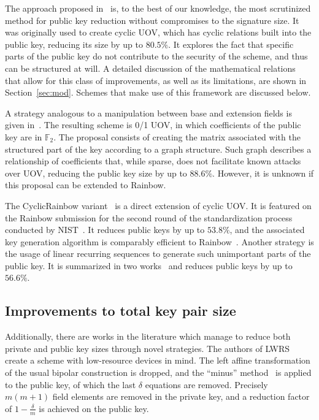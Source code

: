 \documentclass[12pt, a4paper, oneside]{memoir}
\theoremstyle{definition}
\begin{document}
The approach proposed in~\cite{Petzoldt:201006} is, to the best of our knowledge, the most scrutinized method for public key reduction without compromises to the signature size. It was originally used to create cyclic UOV, which has cyclic relations built into the public key, reducing its size by up to $80.5\%$. It explores the fact that specific parts of the public key do not contribute to the security of the scheme, and thus can be structured at will. A detailed discussion of the mathematical relations that allow for this class of improvements, as well as its limitations, are shown in Section~\ref{sec:mod}. Schemes that make use of this framework are discussed below. 

A strategy analogous to a manipulation between base and extension fields is given in~\cite{Petzoldt:201109}. The resulting scheme is 0/1 UOV, in which coefficients of the public key are in $\mathbb{F}_{2}$. The proposal consists of creating the matrix associated with the structured part of the key according to a graph structure. Such graph describes a relationship of coefficients that, while sparse, does not facilitate known attacks over UOV, reducing the public key size by up to $88.6\%$. However, it is unknown if this proposal can be extended to Rainbow.

The CyclicRainbow variant~\cite{Petzoldt:201012} is a direct extension of cyclic UOV. It is featured on the Rainbow submission for the second round of the standardization process conducted by NIST~\cite{Ding:201901}. It reduces public keys by up to $53.8\%$, and the associated key generation algorithm is comparably efficient to Rainbow~\cite{Petzoldt:202004}. Another strategy is the usage of linear recurring sequences to generate such unimportant parts of the public key. It is summarized in two works~\cite{Petzoldt:201103,Petzoldt:201211} and reduces public keys by up to $56.6\%$.

\subsection{Improvements to total key pair size}\label{subsec:both}

Additionally, there are works in the literature which manage to reduce both private and public key sizes through novel strategies. The authors of LWRS~\cite{Zhang:201208} create a scheme with low-resource devices in mind. The left affine transformation of the usual bipolar construction is dropped, and the ``minus'' method~\cite[Subsection 3.2.1]{Wolf:200511} is applied to the public key, of which the last $\delta$ equations are removed. Precisely $m (m + 1)$ field elements are removed in the private key, and a reduction factor of $1 - \frac{\delta}{m}$ is achieved on the public key. 
\end{document}
